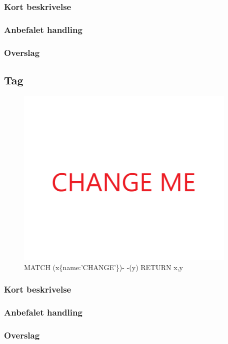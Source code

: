 \documentclass{article}
\begin{document}
\subsubsection{Kort beskrivelse}
\subsubsection{Anbefalet handling}
\subsubsection{Overslag}


\subsection{Tag}
\begin{figure}[h]
\includegraphics[width=300pt]{CHANGE.PNG}
\caption{MATCH (x\{name:'CHANGE'\})- -(y) RETURN x,y}
\end{figure}
\subsubsection{Kort beskrivelse}
\subsubsection{Anbefalet handling}
\subsubsection{Overslag}
\end{document}
